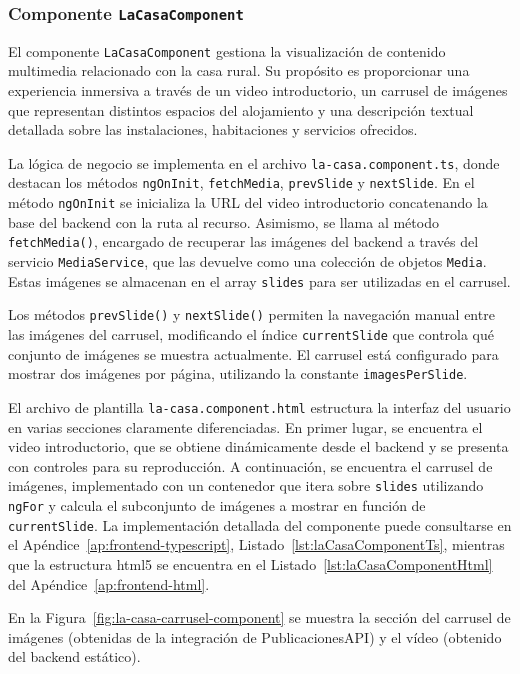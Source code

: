 \subsubsection{Componente \texttt{LaCasaComponent}}

El componente \texttt{LaCasaComponent} gestiona la visualización de contenido multimedia relacionado con la casa rural. Su propósito es proporcionar una experiencia inmersiva a través de un video introductorio, un carrusel de imágenes que representan distintos espacios del alojamiento y una descripción textual detallada sobre las instalaciones, habitaciones y servicios ofrecidos.

La lógica de negocio se implementa en el archivo \texttt{la-casa.component.ts}, donde destacan los métodos \texttt{ngOnInit}, \texttt{fetchMedia}, \texttt{prevSlide} y \texttt{nextSlide}. En el método \texttt{ngOnInit} se inicializa la URL del video introductorio concatenando la base del backend con la ruta al recurso. Asimismo, se llama al método \texttt{fetchMedia()}, encargado de recuperar las imágenes del backend a través del servicio \texttt{MediaService}, que las devuelve como una colección de objetos \texttt{Media}. Estas imágenes se almacenan en el array \texttt{slides} para ser utilizadas en el carrusel.

Los métodos \texttt{prevSlide()} y \texttt{nextSlide()} permiten la navegación manual entre las imágenes del carrusel, modificando el índice \texttt{currentSlide} que controla qué conjunto de imágenes se muestra actualmente. El carrusel está configurado para mostrar dos imágenes por página, utilizando la constante \texttt{imagesPerSlide}.

El archivo de plantilla \texttt{la-casa.component.html} estructura la interfaz del usuario en varias secciones claramente diferenciadas. En primer lugar, se encuentra el video introductorio, que se obtiene dinámicamente desde el backend y se presenta con controles para su reproducción. A continuación, se encuentra el carrusel de imágenes, implementado con un contenedor que itera sobre \texttt{slides} utilizando \texttt{ngFor} y calcula el subconjunto de imágenes a mostrar en función de \texttt{currentSlide}.
La implementación detallada del componente puede consultarse en el Apéndice~\ref{ap:frontend-typescript}, Listado~\ref{lst:laCasaComponentTs}, mientras que la estructura \gls{html5} se encuentra en el Listado~\ref{lst:laCasaComponentHtml} del Apéndice~\ref{ap:frontend-html}.

En la Figura~\ref{fig:la-casa-carrusel-component} se muestra la sección del carrusel de imágenes (obtenidas de la integración de PublicacionesAPI) y el vídeo (obtenido del backend estático).

